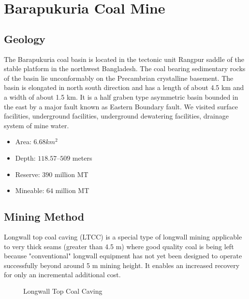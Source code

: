 \documentclass[12pt,a4paper]{article}
\begin{document}
\section{Barapukuria Coal Mine}
\subsection{Geology}
The Barapukuria coal basin is located in the tectonic unit Rangpur saddle of the stable platform in the northwest Bangladesh. The coal bearing sedimentary rocks of the basin lie unconformably on the Precambrian crystalline basement. The basin is elongated in north south direction and has a length of about 4.5 km and a width of about 1.5 km. It is a half graben type asymmetric basin bounded in the east by a major fault known as Eastern Boundary fault. We visited surface facilities, underground facilities, underground dewatering facilities, drainage system of mine water.
\begin{itemize}

\item Area: $6.68 km^2$
\item Depth: $118.57 – 509$ meters
\item Reserve: $390$ million MT
\item Mineable: $64$ million MT

\end{itemize}
\subsection{Mining Method}
Longwall top coal caving (LTCC) is a special type of longwall mining applicable to very thick seams (greater than 4.5 m) where good quality coal is being left because "conventional" longwall equipment has not yet been designed to operate successfully beyond around 5 m mining height. It enables an increased recovery for only an incremental additional cost.
\vspace{10pt}
\begin{figure}[ht]
\centering
{}
\caption{Longwall Top Coal Caving}
\label{ltcc}
\end{figure}
\clearpage
\end{document}
